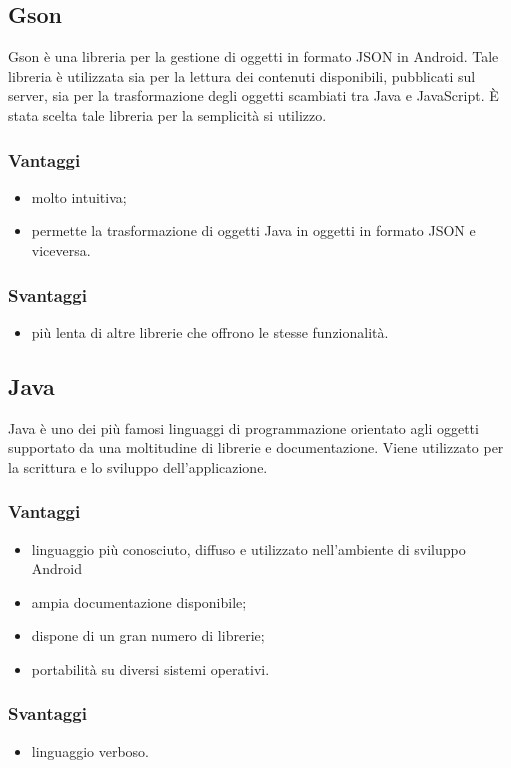 \documentclass[../Tesi.tex]{subfiles}
\begin{document}
	\subsection{Gson}
		Gson è una libreria per la gestione di oggetti in formato JSON in Android. Tale libreria è utilizzata sia per la lettura dei contenuti disponibili, pubblicati sul server, sia per la trasformazione degli oggetti scambiati tra Java e JavaScript. È stata scelta tale libreria per la semplicità si utilizzo.
		\subsubsection{Vantaggi}
			\begin{itemize}
				\item molto intuitiva;
				\item permette la trasformazione di oggetti Java in oggetti in formato JSON e viceversa.
			\end{itemize}	
		\subsubsection{Svantaggi}
			\begin{itemize}
				\item più lenta di altre librerie che offrono le stesse funzionalità.
			\end{itemize}

	\subsection{Java}
		Java è uno dei più famosi linguaggi di programmazione orientato agli oggetti supportato da una moltitudine di librerie e documentazione. Viene utilizzato per la scrittura e lo sviluppo dell'applicazione.
		\subsubsection{Vantaggi}
			\begin{itemize}
				\item linguaggio più conosciuto, diffuso e utilizzato nell'ambiente di sviluppo Android
				\item ampia documentazione disponibile;
				\item dispone di un gran numero di librerie;
				\item portabilità su diversi sistemi operativi.
			\end{itemize}
		\subsubsection{Svantaggi}
			\begin{itemize}
				\item linguaggio verboso.
			\end{itemize}
\end{document}
